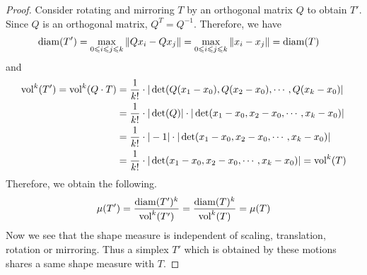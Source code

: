 \begin{proof}
    Consider rotating and mirroring $T$ by an orthogonal matrix $Q$ to obtain $T'$. Since $Q$ is an orthogonal matrix, $Q^T = Q^{-1}$. Therefore, we have
    \begin{align*}
    \operatorname{diam}(T') &= \max_{0\leqslant i\leqslant j\leqslant k} \|Qx_i - Qx_j\|
               = \max_{0\leqslant i\leqslant j\leqslant k} \|x_i - x_j\| = \operatorname{diam}(T)
    \end{align*}
    and 
    \begin{align*}
    \operatorname{vol}^k(T') = \operatorname{vol}^k(Q\cdot T) &= \frac{1}{k!}\cdot |\det(Q(x_1-x_0), Q(x_2-x_0),\cdots, Q(x_k-x_0)|\\
                                &= \frac{1}{k!}\cdot|\det(Q)|\cdot|\det(x_1-x_0, x_2-x_0, \cdots, x_k-x_0)|\\
                                &= \frac{1}{k!}\cdot|-1|\cdot|\det(x_1-x_0, x_2-x_0, \cdots, x_k-x_0)|\\
                                &= \frac{1}{k!}\cdot|\det(x_1-x_0, x_2-x_0, \cdots, x_k-x_0)| = \operatorname{vol}^k(T)
    \end{align*}
    Therefore, we obtain the following.
    \begin{gather*}
    \mu(T') = \frac{\operatorname{diam}(T')^k}{\operatorname{vol}^k(T')} = \frac{\operatorname{diam}(T)^k}{\operatorname{vol}^k(T)} = \mu(T)
    \end{gather*}
    Now we see that the shape measure is independent of scaling, translation, rotation or mirroring. Thus a simplex $T'$ which is obtained by these motions shares a same shape measure with $T$.
    \end{proof}
